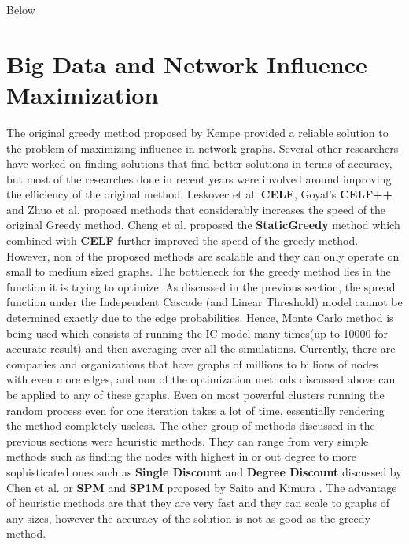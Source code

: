 \documentclass[english]{tktltiki}
\begin{document}
Below 
\newpage

\section{Big Data and Network Influence Maximization}
\label{sec:bigdatanetworkinfluelncemaximization}
The original greedy method proposed by Kempe \cite{kempe03} provided a reliable solution to the problem of maximizing influence in network graphs. Several other researchers have worked on finding solutions that find better solutions in terms of accuracy, but most of the researches done in recent years were involved around improving the efficiency of the original method. Leskovec et al. \cite{leskovec07} \textbf{CELF}, Goyal's \cite{goyal112} \textbf{CELF++} and Zhuo et al. \cite{zhuo13} proposed methods that considerably increases the speed of the original Greedy method. Cheng et al. \cite{cheng13} proposed the \textbf{StaticGreedy} method which combined with \textbf{CELF} further improved the speed of the greedy method.  However, non of the proposed methods are scalable and they can only operate on small to medium sized graphs. The bottleneck for the greedy method lies in the function it is trying to optimize.  As discussed in the previous section, the spread function under the Independent Cascade (and Linear Threshold) model cannot be determined exactly due to the edge probabilities. Hence, Monte Carlo method is being used which consists of running the IC model many times(up to 10000 for accurate result) and then averaging over all the simulations. Currently, there are companies and organizations that have graphs of millions to billions of nodes with even more edges, and non of the optimization methods discussed above can be applied to any of these graphs. Even on most powerful clusters running the random process even for one iteration takes a lot of time, essentially rendering the method completely useless. The other group of methods discussed in the previous sections were heuristic methods. They can range from very simple methods such as finding the nodes with highest in or out degree to more sophisticated ones such as \textbf{Single Discount} and \textbf{Degree Discount} discussed by Chen et al. \cite{chen09} or \textbf{SPM} and \textbf{SP1M} proposed by Saito and Kimura \cite{kimura06}. The advantage of heuristic methods are that they are very fast and they can scale to graphs of any sizes, however the accuracy of the solution is not as good as the greedy method. 
\\
\end{document}
